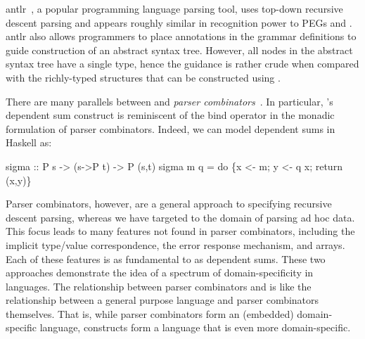 {\sc antlr}~\cite{antlr}, a popular programming language parsing tool, 
uses top-down recursive descent
parsing and appears roughly similar in recognition power to PEGs and \ddc.
{\sc antlr} also allows programmers to place annotations
in the grammar definitions to guide construction of an abstract syntax
tree. However, all nodes in the abstract syntax tree have a 
single type, hence the guidance is rather crude when compared with
the richly-typed structures that can be constructed using
\ddc.




There are many parallels between \ddc{} and {\it parser
combinators}~\cite{burge:parser-combinators,hutton+:parser-combinators}. 
In particular, \ddc{}'s dependent sum construct is 
reminiscent of the bind operator in the monadic formulation of parser
combinators.  Indeed, we can model dependent sums in Haskell as:
\begin{code}
\mbox{}
sigma :: P s -> (s->P t) -> P (s,t)
sigma m q = do \{x <- m; y <- q x; return (x,y)\}
\mbox{}
\end{code}%
\noindent
Parser combinators, however, are a general approach to specifying
recursive descent parsing, whereas we have targeted \ddc{}
to the domain of parsing ad hoc data. This focus leads to 
many features not found in parser combinators, including the implicit
type/value correspondence, the error response mechanism, and 
arrays. Each of these features is as fundamental to \ddc{} as 
dependent sums. These two approaches
demonstrate the idea of a spectrum of domain-specificity in
languages. The relationship between parser combinators and \ddc{} is
like the relationship between a general purpose language and parser
combinators themselves. That is, while parser combinators form an
(embedded) domain-specific language, \ddc{} constructs form a language 
that is even more domain-specific. 


